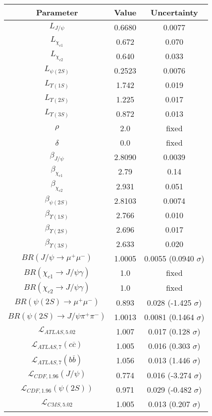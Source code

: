 \begin{table}[h!]
\centering
\begin{tabular}{c|c|c}
Parameter & Value & Uncertainty \\
\hline
$L_{J/\psi}$ & 0.6680 & 0.0077 \\
$L_{\chi_{c1}}$ & 0.672 & 0.070 \\
$L_{\chi_{c2}}$ & 0.640 & 0.033 \\
$L_{\psi(2S)}$ & 0.2523 & 0.0076 \\
$L_{\Upsilon(1S)}$ & 1.742 & 0.019 \\
$L_{\Upsilon(2S)}$ & 1.225 & 0.017 \\
$L_{\Upsilon(3S)}$ & 0.872 & 0.013 \\
$\rho$ & 2.0 & fixed \\
$\delta$ & 0.0 & fixed \\
$\beta_{J/\psi}$ & 2.8090 & 0.0039 \\
$\beta_{\chi_{c1}}$ & 2.79 & 0.14 \\
$\beta_{\chi_{c2}}$ & 2.931 & 0.051 \\
$\beta_{\psi(2S)}$ & 2.8103 & 0.0074 \\
$\beta_{\Upsilon(1S)}$ & 2.766 & 0.010 \\
$\beta_{\Upsilon(2S)}$ & 2.696 & 0.017 \\
$\beta_{\Upsilon(3S)}$ & 2.633 & 0.020 \\
$BR(J/\psi\rightarrow\mu^+\mu^-)$ & 1.0005 & 0.0055 (0.0940 $\sigma$) \\
$BR(\chi_{c1}\rightarrow J/\psi\gamma)$ & 1.0 & fixed \\
$BR(\chi_{c2}\rightarrow J/\psi\gamma)$ & 1.0 & fixed \\
$BR(\psi(2S)\rightarrow\mu^+\mu^-)$ & 0.893 & 0.028 (-1.425 $\sigma$) \\
$BR(\psi(2S)\rightarrow J/\psi\pi^+\pi^-)$ & 1.0013 & 0.0081 (0.1464 $\sigma$) \\
$\mathcal L_{ATLAS,5.02}$ & 1.007 & 0.017 (0.128 $\sigma$) \\
$\mathcal L_{ATLAS,7}(c\overline c)$ & 1.005 & 0.016 (0.303 $\sigma$) \\
$\mathcal L_{ATLAS,7}(b\overline b)$ & 1.056 & 0.013 (1.446 $\sigma$) \\
$\mathcal L_{CDF,1.96}(J/\psi)$ & 0.774 & 0.016 (-3.274 $\sigma$) \\
$\mathcal L_{CDF,1.96}(\psi(2S))$ & 0.971 & 0.029 (-0.482 $\sigma$) \\
$\mathcal L_{CMS,5.02}$ & 1.005 & 0.013 (0.207 $\sigma$) \\

\end{tabular}
\end{table}

